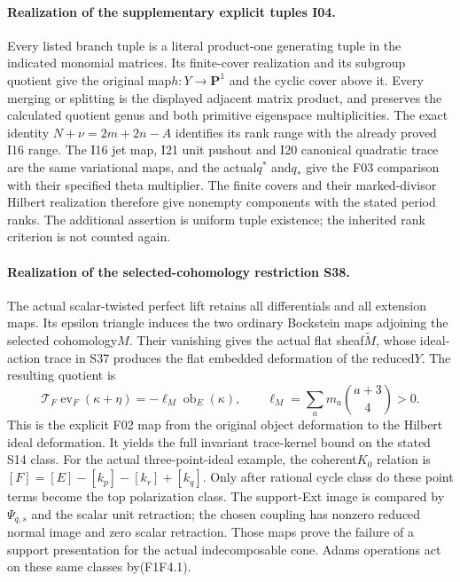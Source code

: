\paragraph{Realization of the supplementary explicit tuples I04.}
Every listed branch tuple is a literal product-one generating
tuple in the indicated monomial matrices. Its finite-cover
realization and its subgroup quotient give the original
map$h:Y\to\mathbf P^1$ and the cyclic cover above it.
Every merging or splitting is the displayed adjacent matrix
product, and preserves the calculated quotient genus and
both primitive eigenspace multiplicities. The exact identity
$N+\nu=2m+2n-A$ identifies its rank range with the already
proved I16 range. The I16 jet map, I21 unit pushout and
I20 canonical quadratic trace are the same variational maps,
and the actual$q^*$ and$q_*$ give the F03 comparison with
their specified theta multiplier. The finite covers and
their marked-divisor Hilbert realization therefore give
nonempty components with the stated period ranks.
The additional assertion is uniform tuple existence;
the inherited rank criterion is not counted again.

\paragraph{Realization of the selected-cohomology restriction S38.}
The actual scalar-twisted perfect lift retains all differentials
and all extension maps. Its epsilon triangle induces the two
ordinary Bockstein maps adjoining the selected cohomology$M$.
Their vanishing gives the actual flat sheaf$\widetilde M$,
whose ideal-action trace in S37 produces the flat embedded
deformation of the reduced$Y$. The resulting quotient is
\[
 \mathcal T_F\operatorname{ev}_F(\kappa+\eta)
                  =-\ell_M\operatorname{ob}_E(\kappa),
 \qquad\ell_M=\sum_a m_a\binom{a+3}{4}>0.
\]
This is the explicit F02 map from the original object
deformation to the Hilbert ideal deformation. It yields
the full invariant trace-kernel bound on the stated S14
class. For the actual three-point-ideal example, the
coherent$K_0$ relation is
$[F]=[E]-[k_p]-[k_r]+[k_q]$.
Only after rational cycle class do these point terms
become the top polarization class. The support-Ext image
is compared by$\Psi_{q,s}$ and the scalar unit retraction;
the chosen coupling has nonzero reduced normal image and
zero scalar retraction. Those maps prove the failure of
a support presentation for the actual indecomposable cone.
Adams operations act on these same classes by(F1F4.1).

